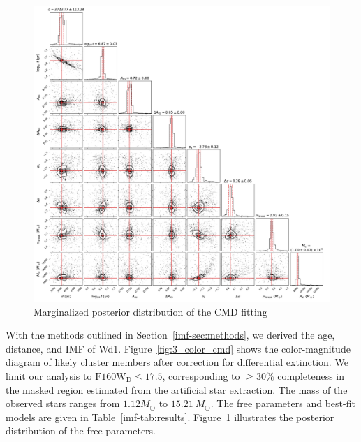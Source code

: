 \documentclass[12pt]{ucsddissertation}
\begin{document}
\begin{CJK*}{UTF8}{gbsn}
\begin{figure}[htb!]
    \centering
    \includegraphics[width=\linewidth]{figures/chapter3/IMF_corner.pdf}
    \caption[Marginalized posterior distribution of the CMD fitting]{Marginalized posterior distribution of the CMD fitting}
    \label{fig:imf_corner}
\end{figure}


With the methods outlined in Section~\ref{imf-sec:methods}, we derived the age, distance, and IMF of Wd1. Figure~\ref{fig:3_color_cmd} shows the color-magnitude diagram of likely cluster members after correction for differential extinction. We limit our analysis to $\mathrm{F160W}_\mathrm{D} \leq 17.5$, corresponding to $\geq 30\%$ completeness in the masked region estimated from the artificial star extraction. The mass of the observed stars ranges from $1.12M_\odot$ to $15.21~M_\odot$. The free parameters and best-fit models are given in Table~\ref{imf-tab:results}. Figure~\ref{fig:imf_corner} illustrates the posterior distribution of the free parameters.


\end{CJK*}
\end{document}
